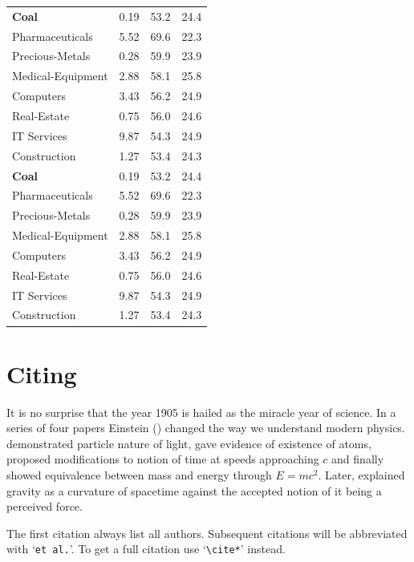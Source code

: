 \documentclass[12pt,twoside,a4paper]{article}
\begin{document}
\begin{longtable}[t]{lccc}
\textbf{Coal}      &  0.19  &  53.2  &  24.4  \\
Pharmaceuticals    &  5.52  &  69.6  &  22.3  \\
Precious-Metals    &  0.28  &  59.9  &  23.9  \\
Medical-Equipment  &  2.88  &  58.1  &  25.8  \\
Computers          &  3.43  &  56.2  &  24.9  \\
Real-Estate        &  0.75  &  56.0  &  24.6  \\
IT Services        &  9.87  &  54.3  &  24.9  \\
Construction       &  1.27  &  53.4  &  24.3  \\

\textbf{Coal}      &  0.19  &  53.2  &  24.4  \\
Pharmaceuticals    &  5.52  &  69.6  &  22.3  \\
Precious-Metals    &  0.28  &  59.9  &  23.9  \\
Medical-Equipment  &  2.88  &  58.1  &  25.8  \\
Computers          &  3.43  &  56.2  &  24.9  \\
Real-Estate        &  0.75  &  56.0  &  24.6  \\
IT Services        &  9.87  &  54.3  &  24.9  \\
Construction       &  1.27  &  53.4  &  24.3  \\

\end{longtable}





\section{Citing}
It is no surprise that the year 1905 is hailed as the miracle year of science. In a series of four papers Einstein (\citeyear{einstein1905_photo_electric, einstein_brownian, einstein_spc_rel, einstein_emc2}) changed the way we understand modern physics. \cite{einstein1905_photo_electric} demonstrated particle nature of light, \cite{einstein_brownian} gave evidence of existence of atoms, \cite{einstein_spc_rel} proposed modifications to notion of time at speeds approaching $c$ and \cite{einstein_emc2} finally showed equivalence between mass and energy through $E=mc^2$. Later, \cite{einstein_gen_rel} explained gravity as a curvature of spacetime against the accepted notion of it being a perceived force.

The first citation \cite{example} always list all authors. Subsequent citations \cite{example} will be abbreviated with `\verb|et al.|'. To get a full citation \cite*{example} use `\verb|\cite*|' instead.



\end{document}
